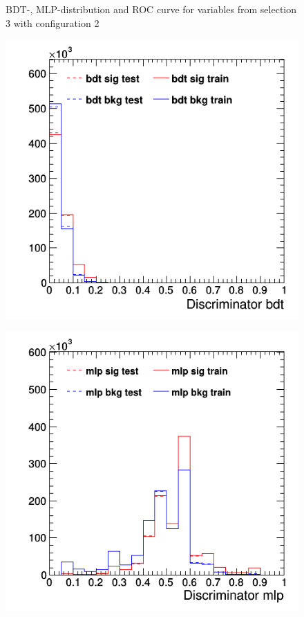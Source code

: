 \documentclass[11pt]{scrartcl}
\begin{document}
\begin{figure}[H]
	\caption{BDT-, MLP-distribution and ROC curve for variables from selection 3 with configuration 2}
	 \label{fig:ROC_s3_config2}	
	\end{figure}
	
	\begin{figure}[H]
	\centering
	\begin{minipage}{.5\textwidth}
	  \centering
	  \includegraphics[width=0.75\linewidth]{figures/MVA/select3/config3/discriminator_bdt.png}
	  \label{fig:distr_s3_config3_bdt}
	\end{minipage}%
	\begin{minipage}{.5\textwidth}
	  \centering
	  \includegraphics[width=0.75\linewidth]{figures/MVA/select3/config3/discriminator_mlp.png}

\end{minipage}
\end{figure}
\end{document}
